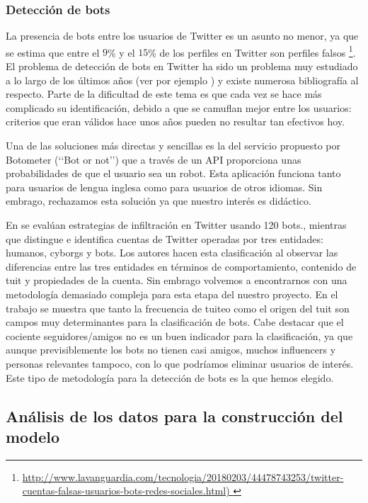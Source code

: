 \subsubsection{Detección de bots}
La presencia de bots entre los usuarios de Twitter es un asunto no menor,  ya que
se estima que entre el $9$\% y el $15$\% de los perfiles en Twitter son
perfiles falsos
\footnote{\url{http://www.lavanguardia.com/tecnologia/20180203/44478743253/twitter-cuentas-falsas-usuarios-bots-redes-sociales.html)  }}. 
El problema de detección de bots en Twitter ha sido un problema muy estudiado
a lo largo de los últimos años (ver por ejemplo \cite{user_class4}) y existe numerosa 
bibliografía al respecto.
Parte de la dificultad de este tema es que cada vez se hace más complicado su identificación,
debido a que se camuflan mejor entre los usuarios: criterios que eran válidos hace unos años pueden
no resultar tan efectivos hoy. 

Una de las soluciones más directas y sencillas es la del servicio propuesto por Botometer 
(\lq\lq Bot or not\rq\rq) que a través de un API proporciona unas probabilidades de que el usuario 
sea un robot. Esta aplicación funciona tanto para usuarios de lengua inglesa como para usuarios 
de otros idiomas. Sin embrago, rechazamos esta solución ya que nuestro interés es didáctico. 

En  \cite{bots1} se evalúan estrategias de infiltración en Twitter usando 120 bots.,
mientras que  \cite{user_class4} distingue e identifica cuentas de Twitter operadas por tres 
entidades: humanos, cyborgs y bots. Los autores hacen esta clasificación al observar las diferencias 
entre las tres entidades en términos de comportamiento, contenido de tuit y propiedades de la cuenta.
Sin embrago volvemos a encontrarnos con una metodología demasiado compleja para esta etapa del nuestro 
proyecto. En el trabajo \cite{user_class6} se muestra que tanto la frecuencia de tuiteo como el origen 
del tuit son campos muy determinantes para la clasificación de bots. Cabe destacar que el cociente 
seguidores/amigos no es un buen indicador para la clasificación, ya que aunque previsiblemente los bots 
no tienen casi amigos, muchos influencers y personas relevantes tampoco, con lo que podríamos eliminar
usuarios de interés. Este tipo de metodología para la detección de bots es la que hemos elegido.

\subsection{Análisis de los datos para la construcción del modelo}


